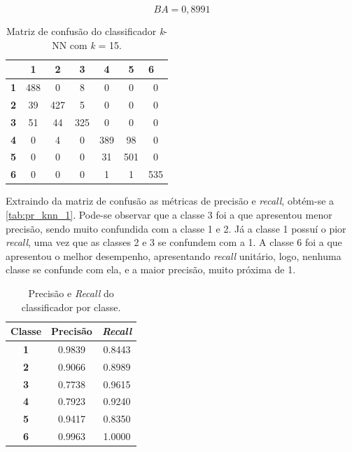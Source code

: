 \begin{equation}\label{eq:ba_knn_1}
	BA = 0,8991
\end{equation}

\begin{table}[H]
	\centering
	\begin{tabular}{c||c|c|c|c|c|c|}
		\cline{2-7}
		& \textbf{1} & \textbf{2} & \textbf{3} & \textbf{4} & \textbf{5} & \multicolumn{1}{l|}{\textbf{6}} \\ \hline \hline
		\multicolumn{1}{|c||}{\textbf{1}} & 488 & 0   & 8   & 0   & 0   & 0   \\ \hline
		\multicolumn{1}{|c||}{\textbf{2}} & 39  & 427 & 5   & 0   & 0   & 0   \\ \hline
		\multicolumn{1}{|c||}{\textbf{3}} & 51  & 44  & 325 & 0   & 0   & 0   \\ \hline
		\multicolumn{1}{|c||}{\textbf{4}} & 0   & 4   & 0   & 389 & 98  & 0   \\ \hline
		\multicolumn{1}{|c||}{\textbf{5}} & 0   & 0   & 0   & 31  & 501 & 0   \\ \hline
		\multicolumn{1}{|c||}{\textbf{6}} & 0   & 0   & 0   & 1   & 1   & 535 \\ \hline
	\end{tabular}
	\caption{Matriz de confusão do classificador \textit{k}-NN com \textit{k} = 15.}
	\label{tab:mc_knn_1}
\end{table}

Extraindo da matriz de confusão as métricas de precisão e \textit{recall}, obtém-se a \autoref{tab:pr_knn_1}. Pode-se observar que a classe 3 foi a que apresentou menor precisão, sendo muito confundida com a classe 1 e 2. Já a classe 1 possuí o pior \textit{recall}, uma vez que as classes 2 e 3 se confundem com a 1. A classe 6 foi a que apresentou o melhor desempenho, apresentando \textit{recall} unitário, logo, nenhuma classe se confunde com ela, e a maior precisão, muito próxima de 1.


\begin{table}[H]
	\centering
	\begin{tabular}{c|c|c}
		\textbf{Classe} & \textbf{Precisão} & \textbf{\textit{Recall}} \\ \hline
		\textbf{1}      & 0.9839 & 0.8443 \\
		\textbf{2}      & 0.9066 & 0.8989 \\
		\textbf{3}      & 0.7738 & 0.9615 \\
		\textbf{4}      & 0.7923 & 0.9240 \\
		\textbf{5}      & 0.9417 & 0.8350 \\
		\textbf{6}      & 0.9963 & 1.0000
	\end{tabular}
	\caption{Precisão e \textit{Recall} do classificador por classe.}
	\label{tab:pr_knn_1}
\end{table}


